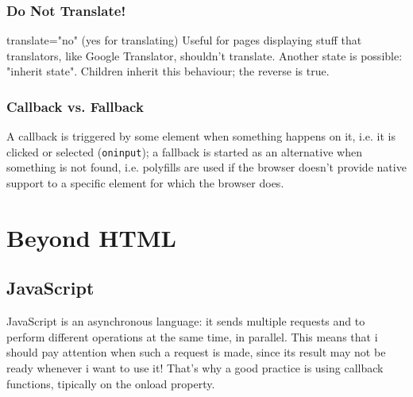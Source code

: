 \documentclass[a4paper,11pt]{book}
\begin{document}
    \section{Do Not Translate!}
    translate="no" (yes for translating)
    Useful for pages displaying stuff that translators, like Google Translator, shouldn't translate.
    Another state is possible: "inherit state".
    Children inherit this behaviour; the reverse is true.
    \section{Callback vs. Fallback}
    A callback is triggered by some element when something happens on it, i.e. it is clicked or selected (\texttt{oninput});
    a fallback is started as an alternative when something is not found, i.e. polyfills are used if the
    browser doesn't provide native support to a specific element for which the browser does.

\part{Beyond HTML}

\chapter{JavaScript}
JavaScript is an asynchronous language: it sends multiple requests and to perform different operations at the same time,
in parallel. This means that i should pay attention when such a request is made, since its result may not be ready
whenever i want to use it! That's why a good practice is using callback functions, tipically on the onload property.
\end{document}
